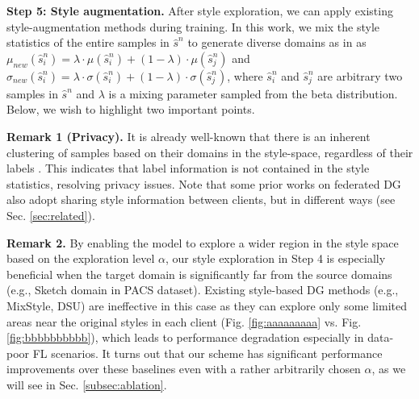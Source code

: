 \documentclass{article}
\theoremstyle{plain}
\theoremstyle{definition}
\theoremstyle{remark}
\begin{document}






\textbf{Step 5: Style augmentation.} After   style exploration, we can apply existing style-augmentation methods during training.   In this work, we mix the style statistics of the entire samples in $\hat{s}^n$ to generate diverse domains as in \cite{zhou2021domain} as
$\mu_{new}(\hat{s}_i^n)= \lambda \cdot \mu(\hat{s}_i^n) + (1 - \lambda) \cdot \mu(\hat{s}_j^n)$ and 
$\sigma_{new}(\hat{s}_i^n)= \lambda \cdot\sigma(\hat{s}_i^n) + (1 - \lambda) \cdot\sigma(\hat{s}_j^n)$, 
where $\hat{s}_i^n$ and $\hat{s}_j^n$ are arbitrary two samples in $\hat{s}^n$ and $\lambda$ is a mixing parameter sampled from the beta distribution.  Below, we  wish to highlight two important points.%

\textbf{Remark 1 (Privacy).}  It is already well-known that   there is an inherent clustering of samples based on their domains in the style-space, regardless of their labels  \cite{zhou2021domain}. This indicates  that label information is not contained in the style statistics, resolving   privacy issues. Note that some prior works  on federated DG \cite{liu2021feddg, chen2023federated}   also adopt sharing style information between clients, but in different ways (see Sec. \ref{sec:related}). 


 \textbf{Remark 2.} By enabling the model to explore a wider region in the style space  based on the exploration level  $\alpha$,   our style exploration in  Step 4 is especially beneficial when  the target domain is significantly far from the source domains (e.g., Sketch domain in PACS dataset). Existing style-based DG methods (e.g., MixStyle, DSU) are ineffective in this case as they can explore only some limited areas near the original styles in each client (Fig. \ref{fig:aaaaaaaaa} vs. Fig. \ref{fig:bbbbbbbbbb}),  which leads to performance degradation especially in data-poor FL scenarios.   It turns out that our scheme has significant performance improvements over these baselines even with a rather   arbitrarily  chosen $\alpha$, as we will see in Sec. \ref{subsec:ablation}. 
\end{document}
